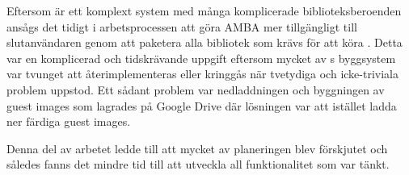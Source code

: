 Eftersom \stoe{} är ett komplext system med många komplicerade
biblioteksberoenden ansågs det tidigt i arbetsprocessen att göra AMBA mer
tillgängligt till slutanvändaren genom att paketera alla bibliotek som krävs för
att köra \stoe{}. Detta var en komplicerad och tidskrävande uppgift eftersom
mycket av \stoe{}s byggsystem var tvunget att återimplementeras eller kringgås
när tvetydiga och icke-triviala problem uppstod. Ett sådant problem var
nedladdningen och byggningen av guest images som \stoe{} lagrades på Google
Drive där lösningen var att istället ladda ner färdiga guest images.

Denna del av arbetet ledde till att mycket av planeringen blev förskjutet och
således fanns det mindre tid till att utveckla all funktionalitet som var tänkt.
